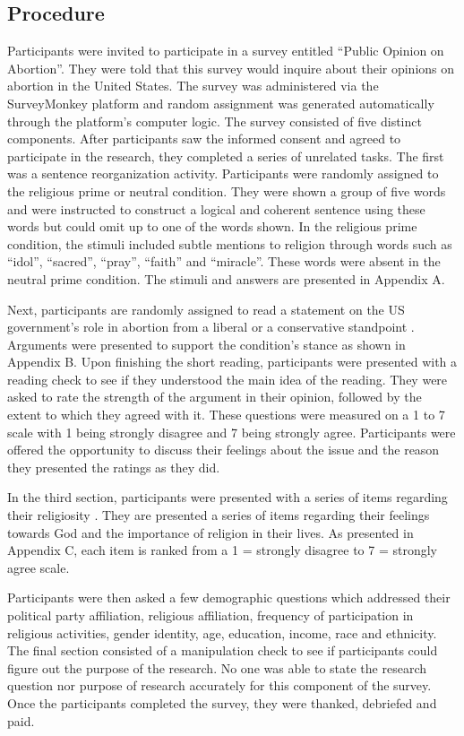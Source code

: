 \documentclass[letterpaper,man,natbib,noextraspace,12pt]{apa6}  %
\begin{document}
\subsection{Procedure}

Participants were invited to participate in a survey entitled “Public Opinion on Abortion”. They were told that this survey would inquire about their opinions on abortion in the United States. The survey was administered via the SurveyMonkey platform and random assignment was generated automatically through the platform’s computer logic. 
The survey consisted of five distinct components. After participants saw the informed consent and agreed to participate in the research, they completed a series of unrelated tasks. The first was a sentence reorganization activity. \citep{bakhti_religious_2018} Participants were randomly assigned to the religious prime or neutral condition. They were shown a group of five words and were instructed to construct a logical and coherent sentence using these words but could omit up to one of the words shown. In the religious prime condition, the stimuli included subtle mentions to religion through words such as “idol”, “sacred”, “pray”, “faith” and “miracle”. These words were absent in the neutral prime condition. The stimuli and answers are presented in Appendix A.

Next, participants are randomly assigned to read a statement on the US government’s role in abortion from a liberal or a conservative standpoint \citep{suhay_role_2018}. Arguments were presented to support the condition’s stance as shown in Appendix B. Upon finishing the short reading, participants were presented with a reading check to see if they understood the main idea of the reading. They were asked to rate the strength of the argument in their opinion, followed by the extent to which they agreed with it. These questions were measured on a 1 to 7 scale with 1 being strongly disagree and 7 being strongly agree. Participants were offered the opportunity to discuss their feelings about the issue and the reason they presented the ratings as they did. 

In the third section, participants were presented with a series of items regarding their religiosity \citep{bakhti_religious_2018}. They are presented a series of items regarding their feelings towards God and the importance of religion in their lives. As presented in Appendix C, each item is ranked from a 1 = strongly disagree to 7 = strongly agree scale. 

Participants were then asked a few demographic questions which addressed their political party affiliation, religious affiliation, frequency of participation in religious activities, gender identity, age, education, income, race and ethnicity. The final section consisted of a manipulation check to see if participants could figure out the purpose of the research. No one was able to state the research question nor purpose of research accurately for this component of the survey. Once the participants completed the survey, they were thanked, debriefed and paid. 
\end{document}
